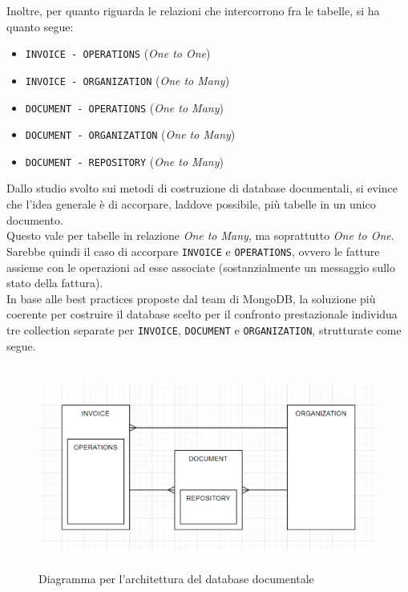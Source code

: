\noindent Inoltre, per quanto riguarda le relazioni che intercorrono fra le tabelle, si ha quanto segue:
\begin{itemize}
    \item \texttt{INVOICE - OPERATIONS} (\textit{One to One})
    \item \texttt{INVOICE - ORGANIZATION} (\textit{One to Many})
    \item \texttt{DOCUMENT - OPERATIONS} (\textit{One to Many})
    \item \texttt{DOCUMENT - ORGANIZATION} (\textit{One to Many})
    \item \texttt{DOCUMENT - REPOSITORY} (\textit{One to Many})
\end{itemize}

\noindent Dallo studio svolto sui metodi di costruzione di database documentali, si evince che l'idea generale è di accorpare, laddove possibile, più tabelle in un unico documento.\\
Questo vale per tabelle in relazione \textit{One to Many}, ma soprattutto \textit{One to One}.\\
Sarebbe quindi il caso di accorpare \texttt{INVOICE} e \texttt{OPERATIONS}, ovvero le fatture assieme con le operazioni ad esse associate (sostanzialmente un messaggio sullo stato della fattura).\\

\noindent In base alle best practices proposte dal team di MongoDB, la soluzione più coerente per costruire il database scelto per il confronto prestazionale individua tre collection separate per \texttt{INVOICE}, \texttt{DOCUMENT} e \texttt{ORGANIZATION}, strutturate come segue.\\

\begin{figure}[htbp]
\begin{center}
\includegraphics[height=18em]{immagini/ER-Mongo-IC.png}
\caption{Diagramma per l'architettura del database documentale}
\end{center}
\end{figure}

